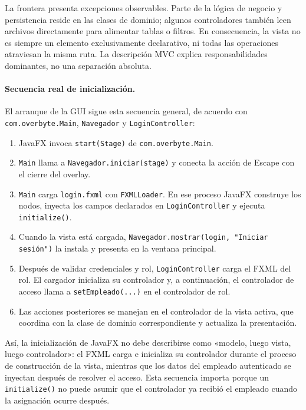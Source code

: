 La frontera presenta excepciones observables. Parte de la lógica de negocio y persistencia reside en las clases de dominio; algunos controladores también leen archivos directamente para alimentar tablas o filtros. En consecuencia, la vista no es siempre un elemento exclusivamente declarativo, ni todas las operaciones atraviesan la misma ruta. La descripción MVC explica responsabilidades dominantes, no una separación absoluta.

\paragraph{Secuencia real de inicialización.}

El arranque de la GUI sigue esta secuencia general, de acuerdo con \texttt{com.overbyte.Main}, \texttt{Navegador} y \texttt{LoginController}:

\begin{enumerate}
    \item JavaFX invoca \texttt{start(Stage)} de \texttt{com.overbyte.Main}.
    \item \texttt{Main} llama a \texttt{Navegador.iniciar(stage)} y conecta la acción de Escape con el cierre del overlay.
    \item \texttt{Main} carga \texttt{login.fxml} con \texttt{FXMLLoader}. En ese proceso JavaFX construye los nodos, inyecta los campos declarados en \texttt{LoginController} y ejecuta \texttt{initialize()}.
    \item Cuando la vista está cargada, \texttt{Navegador.mostrar(login, "Iniciar sesión")} la instala y presenta en la ventana principal.
    \item Después de validar credenciales y rol, \texttt{LoginController} carga el FXML del rol. El cargador inicializa su controlador y, a continuación, el controlador de acceso llama a \texttt{setEmpleado(...)} en el controlador de rol.
    \item Las acciones posteriores se manejan en el controlador de la vista activa, que coordina con la clase de dominio correspondiente y actualiza la presentación.
\end{enumerate}

Así, la inicialización de JavaFX no debe describirse como «modelo, luego vista, luego controlador»: el FXML carga e inicializa su controlador durante el proceso de construcción de la vista, mientras que los datos del empleado autenticado se inyectan después de resolver el acceso. Esta secuencia importa porque un \texttt{initialize()} no puede asumir que el controlador ya recibió el empleado cuando la asignación ocurre después.

